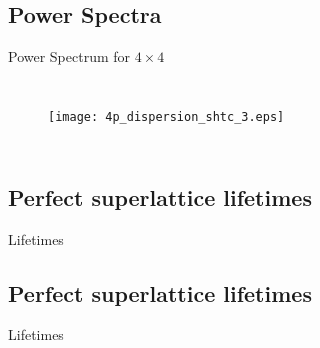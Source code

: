 \documentclass{beamer}
\begin{document}
\subsection{Power Spectra}
\begin{frame}{Power Spectrum for $4 \times 4$}
\begin{columns}
\begin{figure}[t]
\vspace*{-1cm}
\hspace*{-0.9cm}
\texttt{[image: 4p\_dispersion\_shtc\_3.eps]}
\renewcommand{\figure}{Fig.}
\label{fig:disp_4p}
\end{figure}
\begin{figure}[t]
\vspace*{-1.2cm}
\hspace*{1.9cm}
\renewcommand{\figure}{Fig.}
\label{fig:sed}
\end{figure}
\end{columns}
\end{frame}

\subsection{Perfect superlattice lifetimes}
\begin{frame}{Lifetimes}
\begin{figure}[!h]
\begin{center}
\vspace*{-0.8cm}
\hspace*{-1cm}
\renewcommand{\figure}{Fig.}
\label{fig:lifetimes}
\end{center}
\end{figure}
\end{frame}
\subsection{Perfect superlattice lifetimes}
\begin{frame}{Lifetimes}
\begin{figure}[!h]
\begin{center}
\vspace*{-0.8cm}
\hspace*{-1cm}
\renewcommand{\figure}{Fig.}
\label{fig:lifetimes}
\end{center}
\end{figure}
\end{frame}
\end{document}
